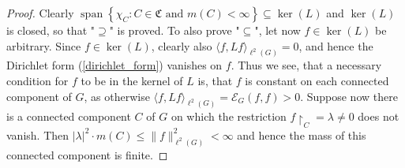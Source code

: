 \documentclass[10pt,a4paper]{amsart}
\begin{document}
\begin{proof}
Clearly $\operatorname{span} \left\{ \chi_C : C \in \mathfrak{C} \text{ and } m(C) < \infty \right\} \subseteq \ker(L)$ and $\ker(L)$ is closed, so that "$\supseteq
$"  is proved.
To also prove "$\subseteq$", let now $f \in \ker(L)$ be arbitrary.  Since $f \in \ker(L)$,  clearly also $\langle f, L f \rangle_{\ell^2(G)} = 0$, and hence the Dirichlet form (\ref{dirichlet_form}) vanishes on $f$. Thus we see, that a necessary condition for $f$ to be in the kernel of $L$ is, that $f$ is constant on each connected component of $G$, as otherwise $\langle f, L f \rangle_{\ell^2(G)} = \mathcal{E}_G(f,f) > 0$. Suppose now there is a connected component $C$ of $G$ on which the restriction $f{\restriction_C} = \lambda \neq 0$ does not vanish. Then $|\lambda|^2 \cdot m(C) \leq \|f\|^2_{\ell^2(G)} < \infty$ and hence the mass of this connected component is finite.
\end{proof}
\end{document}
